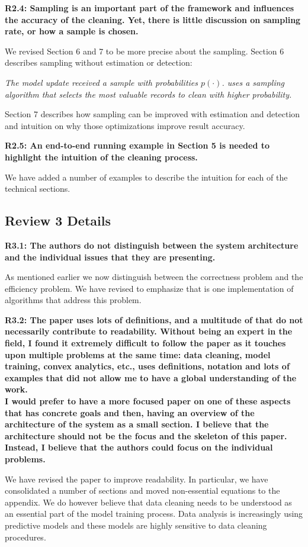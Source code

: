 \textbf{R2.4: Sampling is an important part of the framework and influences the accuracy of the cleaning. Yet, there is little discussion on sampling rate, or how a sample is chosen.}

We revised Section 6 and 7 to be more precise about the sampling.
Section 6 describes sampling without estimation or detection:

\emph{The model update received a sample with probabilities $p(\cdot)$.
\sys uses a sampling algorithm that selects the most valuable records to clean with higher probability. }

\vspace{0.5em}

Section 7 describes how sampling can be improved with estimation and detection and intuition on why those optimizations improve result accuracy.

\textbf{R2.5: An end-to-end running example in Section 5 is needed to highlight the intuition of the cleaning process.}

We have added a number of examples to describe the intuition for each of the technical sections.

\vspace{0.5em}


\subsection*{Review 3 Details}
\noindent\textbf{R3.1: The authors do not distinguish between the system architecture and the individual issues that they are presenting.}

As mentioned earlier we now distinguish between the correctness problem and the efficiency problem.
We have revised to emphasize that \sys is one implementation of algorithms that address this problem.

\vspace{0.5em}

\noindent\textbf{R3.2: The paper uses lots of definitions, and a multitude of that do not necessarily contribute to readability.
Without being an expert in the field, I found it extremely difficult to follow the paper as it touches upon multiple problems at the same time: data cleaning, model training, convex analytics, etc., uses definitions, notation and lots of examples that did not allow me to have a global understanding of the work.\\
I would prefer to have a more focused paper on one of these aspects that has concrete goals and then, having an overview of the architecture of the system as a small section. I believe that the architecture should not be the focus and the skeleton of this paper. Instead, I believe that the authors could focus on the individual problems.}

We have revised the paper to improve readability. In particular, we have consolidated a number of sections and moved non-essential equations to the appendix. We do however believe that data cleaning needs to be understood as an essential part of the model training process. Data analysis is increasingly using predictive models and these models are highly sensitive to data cleaning procedures.

